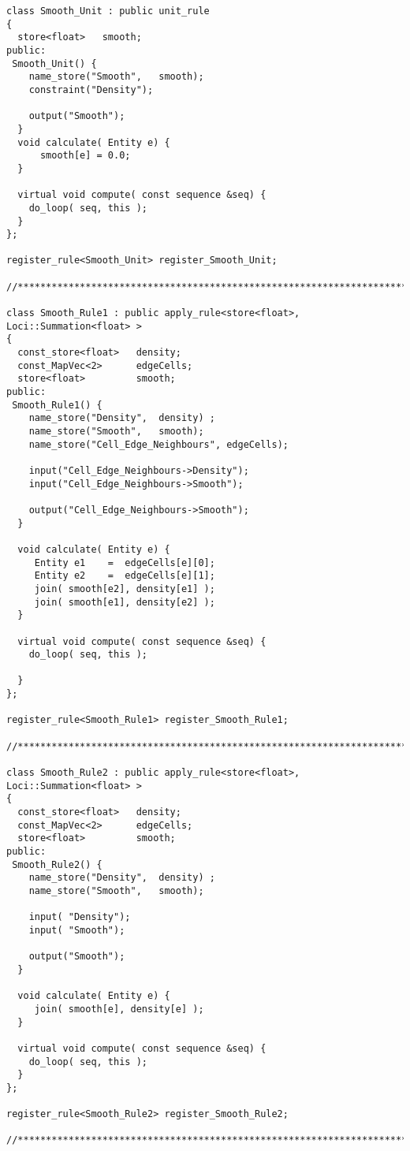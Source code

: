 \begin{itemize}
\begin{verbatim}
class Smooth_Unit : public unit_rule
{
  store<float>   smooth;
public:
 Smooth_Unit() {
    name_store("Smooth",   smooth);
    constraint("Density");

    output("Smooth");
  }
  void calculate( Entity e) {
      smooth[e] = 0.0;
  }

  virtual void compute( const sequence &seq) {
    do_loop( seq, this );
  }
};

register_rule<Smooth_Unit> register_Smooth_Unit;

//*********************************************************************

class Smooth_Rule1 : public apply_rule<store<float>, Loci::Summation<float> >
{
  const_store<float>   density;
  const_MapVec<2>      edgeCells;
  store<float>         smooth;
public:
 Smooth_Rule1() {
    name_store("Density",  density) ;
    name_store("Smooth",   smooth);
    name_store("Cell_Edge_Neighbours", edgeCells);

    input("Cell_Edge_Neighbours->Density");
    input("Cell_Edge_Neighbours->Smooth");

    output("Cell_Edge_Neighbours->Smooth");
  }

  void calculate( Entity e) {
     Entity e1    =  edgeCells[e][0];
     Entity e2    =  edgeCells[e][1];
     join( smooth[e2], density[e1] );
     join( smooth[e1], density[e2] );
  }

  virtual void compute( const sequence &seq) {
    do_loop( seq, this );

  }
};

register_rule<Smooth_Rule1> register_Smooth_Rule1;

//*********************************************************************

class Smooth_Rule2 : public apply_rule<store<float>, Loci::Summation<float> >
{
  const_store<float>   density;
  const_MapVec<2>      edgeCells;
  store<float>         smooth;
public:
 Smooth_Rule2() {
    name_store("Density",  density) ;
    name_store("Smooth",   smooth);

    input( "Density");
    input( "Smooth");

    output("Smooth");
  }

  void calculate( Entity e) {
     join( smooth[e], density[e] );
  }

  virtual void compute( const sequence &seq) {
    do_loop( seq, this );
  }
};

register_rule<Smooth_Rule2> register_Smooth_Rule2;

//*********************************************************************
\end{verbatim}
\end{itemize}
